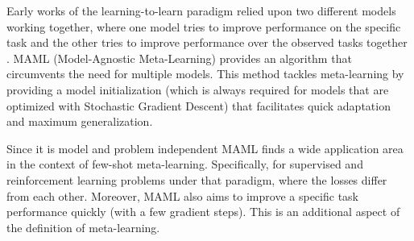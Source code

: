 Early works of the learning-to-learn paradigm relied upon two different models working together, where one model tries to improve performance on the specific task and the other tries to improve performance over the observed tasks together \cite{thrun1998}. MAML (Model-Agnostic Meta-Learning) \cite{finn2017} provides an algorithm that circumvents the need for multiple models. This method tackles meta-learning by providing a model initialization (which is always required for models that are optimized with Stochastic Gradient Descent) that facilitates quick adaptation and maximum generalization.


Since it is model and problem independent MAML finds a wide application area in the context of few-shot meta-learning. Specifically, for supervised and reinforcement learning problems under that paradigm, where the losses differ from each other.  Moreover, MAML also aims to improve a specific task performance quickly (with a few gradient steps). This is an additional aspect of the definition of meta-learning. 


